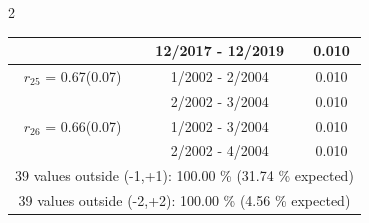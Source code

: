 \begin{multicols}{2}
{\begin{tabular}{ccc}
&       12/2017 - 12/2019 &        0.010  \vspace{-.02in} \\ \hline 
  $r_{25}$ = 0.67(0.07) &       1/2002 -  2/2004 &        0.010   \vspace{-.10in} \\  
&        2/2002 -  3/2004 &        0.010  \vspace{-.02in} \\ \hline 
  $r_{26}$ = 0.66(0.07) &       1/2002 -  3/2004 &        0.010   \vspace{-.10in} \\  
&        2/2002 -  4/2004 &        0.010  \vspace{-.02in} \\ \hline 
\multicolumn{3}{c}{              39 values outside (-1,+1): 100.00  \% (31.74  \% expected)}\vspace{-.10in} \\ 
\multicolumn{3}{c}{              39 values outside (-2,+2): 100.00 \%  (4.56 \% expected) } \\
 \end{tabular} \\ 
 } 
\end{multicols} 
